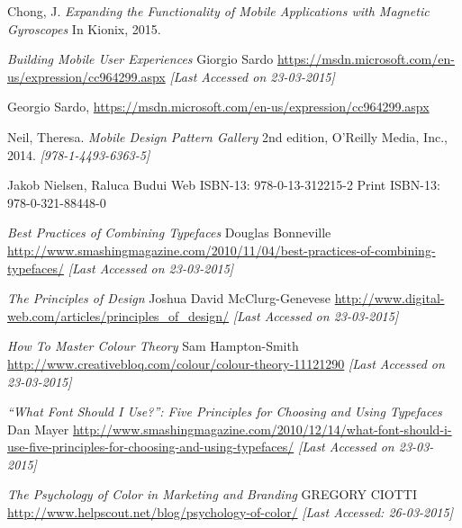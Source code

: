 \begin{thebibliography}{9}


  Chong, J. 
  \textit{Expanding the Functionality of Mobile Applications with Magnetic Gyroscopes} 
  In Kionix,
  2015.
  
	\textit{Building Mobile User Experiences}
	Giorgio Sardo
	\url{https://msdn.microsoft.com/en-us/expression/cc964299.aspx}
	\textit{[Last Accessed on 23-03-2015]}
	
  Georgio Sardo,
  \url{https://msdn.microsoft.com/en-us/expression/cc964299.aspx}
  

	Neil, Theresa.
	\textit{Mobile Design Pattern Gallery}
	2nd edition,
	O'Reilly Media, Inc.,
	2014.
	\textit{[978-1-4493-6363-5]}
		
	Jakob Nielsen, Raluca Budui
	Web ISBN-13: 978-0-13-312215-2
	Print ISBN-13: 978-0-321-88448-0
	
	\textit{Best Practices of Combining Typefaces}
	Douglas Bonneville
	\url{http://www.smashingmagazine.com/2010/11/04/best-practices-of-combining-typefaces/}
	\textit{[Last Accessed on 23-03-2015]}
	
	\textit{The Principles of Design}
	Joshua David McClurg-Genevese
	\url{http://www.digital-web.com/articles/principles_of_design/}
	\textit{[Last Accessed on 23-03-2015]}
	
	\textit{How To Master Colour Theory}
	Sam Hampton-Smith
	\url{http://www.creativebloq.com/colour/colour-theory-11121290}
	\textit{[Last Accessed on 23-03-2015]}
	
	\textit{“What Font Should I Use?”: Five Principles for Choosing and Using Typefaces}
	Dan Mayer
	\url{http://www.smashingmagazine.com/2010/12/14/what-font-should-i-use-five-principles-for-choosing-and-using-typefaces/}
	\textit{[Last Accessed on 23-03-2015]}
	
	\textit{The Psychology of Color in Marketing and Branding}
	GREGORY CIOTTI
	\url{http://www.helpscout.net/blog/psychology-of-color/}
	\textit{[Last Accessed: 26-03-2015]}
		
	
\end{thebibliography}